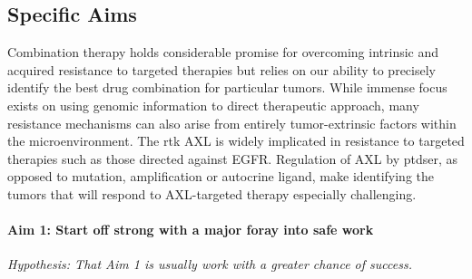 

\newcommand{\SpecificAimOne}{Start off strong with a major foray into safe work}
\newcommand{\SpecificAimOneA}{A task that comes with convincing preliminary data}
\newcommand{\SpecificAimOneB}{Another task that is essential to the later efforts}
\newcommand{\SpecificAimOneC}{One more task that needs to be accomplished early on in the project}
\newcommand{\SpecificAimOneD}{Validate model predictions of the relationship between signaling network state and resistance}

\newcommand{\SpecificAimTwo}{That middle area where you will probably end up spending most of your time}
\newcommand{\SpecificAimTwoA}{One of those tasks that just could not be skipped}
\newcommand{\SpecificAimTwoB}{A task I am really looking forward to}
\newcommand{\SpecificAimTwoC}{Something pulling this whole aim together}

\newcommand{\SpecificAimThree}{A third major area that is quite risky}
\newcommand{\SpecificAimThreeA}{Since we are just warming up this task is more likely to be feasible}
\newcommand{\SpecificAimThreeB}{Getting this to happen will really be quite pricey}
\newcommand{\SpecificAimThreeC}{This task really pulls everything together but will require everything working perfectly}


\subsection{Specific Aims}

Combination therapy holds considerable promise for overcoming intrinsic and acquired resistance to targeted therapies but relies on our ability to precisely identify the best drug combination for particular tumors. While immense focus exists on using genomic information to direct therapeutic approach, many resistance mechanisms can also arise from entirely tumor-extrinsic factors within the microenvironment. The \gls{rtk} AXL is widely implicated in resistance to targeted therapies such as those directed against EGFR. Regulation of AXL by \gls{ptdser}, as opposed to mutation, amplification or autocrine ligand, make identifying the tumors that will respond to AXL-targeted therapy especially challenging\cite{Meyer:CellSys}.

\paragraph*{Aim 1: \SpecificAimOne} \emph{Hypothesis: That Aim 1 is usually work with a greater chance of success.}


